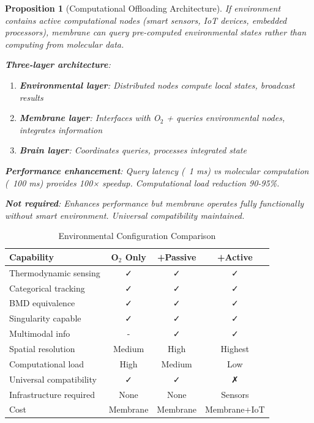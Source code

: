 \documentclass[11pt,a4paper]{article}
\newtheorem{proposition}[theorem]{Proposition}
\theoremstyle{definition}
\theoremstyle{remark}
\begin{document}
\begin{proposition}[Computational Offloading Architecture]
If environment contains active computational nodes (smart sensors, IoT devices, embedded processors), membrane can query pre-computed environmental states rather than computing from molecular data.

\textbf{Three-layer architecture}:
\begin{enumerate}
\item \textbf{Environmental layer}: Distributed nodes compute local states, broadcast results
\item \textbf{Membrane layer}: Interfaces with O$_2$ + queries environmental nodes, integrates information
\item \textbf{Brain layer}: Coordinates queries, processes integrated state
\end{enumerate}

\textbf{Performance enhancement}: Query latency (~1 ms) vs molecular computation (~100 ms) provides 100× speedup. Computational load reduction 90-95\%.

\textbf{Not required}: Enhances performance but membrane operates fully functionally without smart environment. Universal compatibility maintained.
\end{proposition}

\begin{table}[h]
\centering
\caption{Environmental Configuration Comparison}
\begin{tabular}{lccc}
\toprule
\textbf{Capability} & \textbf{O$_2$ Only} & \textbf{+Passive} & \textbf{+Active} \\
\midrule
Thermodynamic sensing & ✓ & ✓ & ✓ \\
Categorical tracking & ✓ & ✓ & ✓ \\
BMD equivalence & ✓ & ✓ & ✓ \\
Singularity capable & ✓ & ✓ & ✓ \\
\midrule
Multimodal info & - & ✓ & ✓ \\
Spatial resolution & Medium & High & Highest \\
Computational load & High & Medium & Low \\
\midrule
Universal compatibility & ✓ & ✓ & ✗ \\
Infrastructure required & None & None & Sensors \\
Cost & Membrane & Membrane & Membrane+IoT \\
\bottomrule
\end{tabular}
\end{table}
\end{document}
